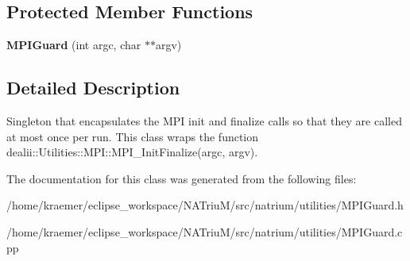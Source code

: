 \subsection*{Protected Member Functions}
\begin{DoxyCompactItemize}
\item 
\hypertarget{classnatrium_1_1MPIGuard_a8c962bb3cb17b91c2142b2a3b7e0bae2}{{\bfseries M\-P\-I\-Guard} (int argc, char $\ast$$\ast$argv)}\label{classnatrium_1_1MPIGuard_a8c962bb3cb17b91c2142b2a3b7e0bae2}

\end{DoxyCompactItemize}


\subsection{Detailed Description}
Singleton that encapsulates the M\-P\-I init and finalize calls so that they are called at most once per run. This class wraps the function dealii\-::\-Utilities\-::\-M\-P\-I\-::\-M\-P\-I\-\_\-\-Init\-Finalize(argc, argv). 

The documentation for this class was generated from the following files\-:\begin{DoxyCompactItemize}
\item 
/home/kraemer/eclipse\-\_\-workspace/\-N\-A\-Triu\-M/src/natrium/utilities/M\-P\-I\-Guard.\-h\item 
/home/kraemer/eclipse\-\_\-workspace/\-N\-A\-Triu\-M/src/natrium/utilities/M\-P\-I\-Guard.\-cpp\end{DoxyCompactItemize}
